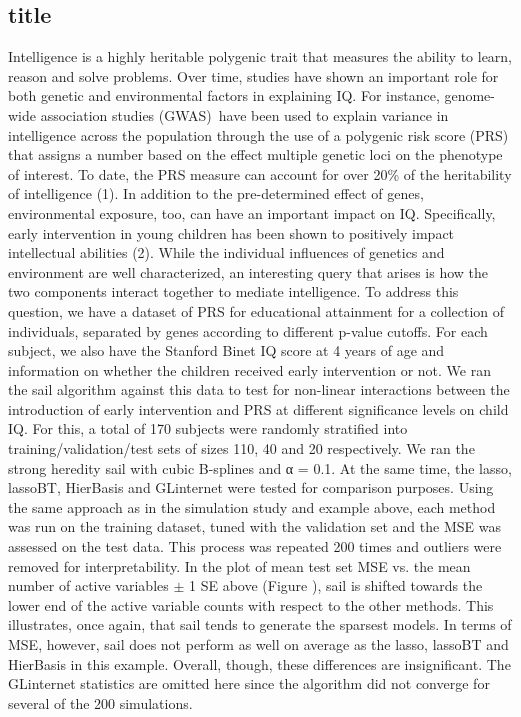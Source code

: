 \documentclass[12pt,letter]{article}\usepackage[]{graphicx}\usepackage[]{color}
\begin{document}
\subsection{title}

Intelligence is a highly heritable polygenic trait that measures the ability to learn, reason and solve problems. Over time, studies have shown an important role for both genetic and environmental factors in explaining IQ. For instance, genome-wide association studies (GWAS) have been used to explain variance in intelligence across the population through the use of a polygenic risk score (PRS) that assigns a number based on the effect multiple genetic loci on the phenotype of interest. To date, the PRS measure can account for over 20\% of the heritability of intelligence (1). In addition to the pre-determined effect of genes, environmental exposure, too, can have an important impact on IQ. Specifically, early intervention in young children has been shown to positively impact intellectual abilities (2). 
While the individual influences of genetics and environment are well characterized, an interesting query that arises is how the two components interact together to mediate intelligence. To address this question, we have a dataset of PRS for educational attainment for a collection of individuals, separated by genes according to different p-value cutoffs. For each subject, we also have the Stanford Binet IQ score at 4 years of age and information on whether the children received early intervention or not. We ran the sail algorithm against this data to test for non-linear interactions between the introduction of early intervention and PRS at different significance levels on child IQ. For this, a total of 170 subjects were randomly stratified into training/validation/test sets of sizes 110, 40 and 20 respectively. We ran the strong heredity sail with cubic B-splines and α = 0.1. At the same time, the lasso, lassoBT, HierBasis and GLinternet were tested for comparison purposes. Using the same approach as in the simulation study and example above, each method was run on the training dataset, tuned with the validation set and the MSE was assessed on the test data. This process was repeated 200 times and outliers were removed for interpretability. In the plot of mean test set MSE vs. the mean number of active variables $\pm$ 1 SE above (Figure ), sail is shifted towards the lower end of the active variable counts with respect to the other methods. This illustrates, once again, that sail tends to generate the sparsest models. In terms of MSE, however, sail does not perform as well on average as the lasso, lassoBT and HierBasis in this example. Overall, though, these differences are insignificant. The GLinternet statistics are omitted here since the algorithm did not converge for several of the 200 simulations.
\end{document}
